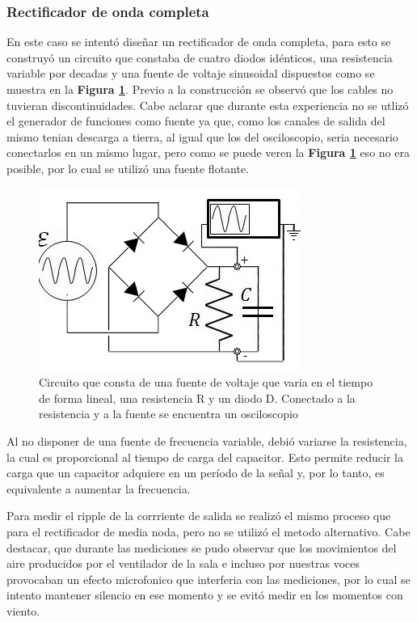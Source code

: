 \documentclass[11pt,a4paper]{article}
\begin{document}
\subsubsection{Rectificador de onda completa}
En este caso se intentó diseñar un rectificador de onda completa, para esto se construyó un circuito que constaba de cuatro diodos idénticos, una resistencia variable por decadas y una fuente de voltaje sinusoidal dispuestos como se muestra en la \textbf{Figura \ref{fig:Rect-O}}. Previo a la construcción se observó que los cables no tuvieran discontinuidades. Cabe aclarar que durante esta experiencia no se utlizó el generador de funciones como fuente ya que, como los canales de salida del mismo tenian descarga a tierra, al igual que los del osciloscopio, seria necesario conectarlos en un mismo lugar, pero como se puede veren la \textbf{Figura \ref{fig:Rect-O}} eso no era posible, por lo cual se utilizó una fuente flotante. 

\begin{figure}[H]
\centering
\includegraphics[scale=0.8]{Rectificador-Onda-Completa}
   \caption{Circuito que consta de una fuente de voltaje que varia en el tiempo de forma lineal, una resistencia R y un diodo D. Conectado a la resistencia y a la fuente se encuentra un osciloscopio}
   \label{fig:Rect-O}
\end{figure}

Al no disponer de una fuente de frecuencia variable, debió variarse la resistencia, la cual es proporcional al tiempo de carga del capacitor. Esto permite reducir la carga que un capacitor adquiere en un período de la señal y, por lo tanto, es equivalente a aumentar la frecuencia. 

Para medir el ripple de la corrriente de salida se realizó el mismo proceso que para el rectificador de media noda, pero no se utilizó el metodo alternativo. Cabe destacar, que durante las mediciones se pudo observar que los movimientos del aire producidos por el ventilador de la sala e incluso por nuestras voces provocaban un efecto microfonico que interferia con las mediciones, por lo cual se intento mantener silencio en ese momento y se evitó medir en los momentos con viento.
\end{document}
